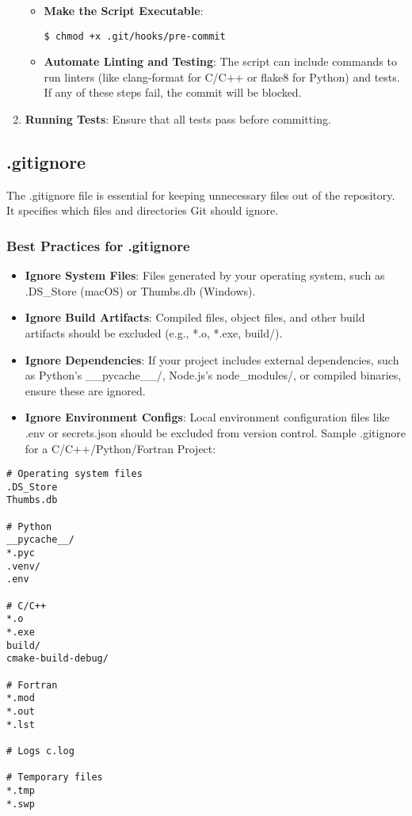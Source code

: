 \documentclass{ol-softwaremanual}
\begin{document}
\begin{enumerate}
\begin{itemize}
\item \textbf{Make the Script Executable}:
\begin{terminal}
\begin{verbatim}
$ chmod +x .git/hooks/pre-commit
\end{verbatim}
\end{terminal}

\item \textbf{Automate Linting and Testing}:
The script can include commands to run linters (like clang-format for C/C++ or flake8 for Python) and tests. If any of these steps fail, the commit will be blocked.
\end{itemize}
\item \textbf{Running Tests}: Ensure that all tests pass before committing.
\end{enumerate}
\subsection{.gitignore}
The .gitignore file is essential for keeping unnecessary files out of the repository. It specifies which files and directories Git should ignore.

\subsubsection{Best Practices for .gitignore}
\begin{itemize}
    \item \textbf{Ignore System Files}: Files generated by your operating system, such as .DS\_Store (macOS) or Thumbs.db (Windows).
    \item \textbf{Ignore Build Artifacts}: Compiled files, object files, and other build artifacts should be excluded (e.g., *.o, *.exe, build/).
    \item \textbf{Ignore Dependencies}: If your project includes external dependencies, such as Python’s \_\_pycache\_\_/, Node.js’s node\_modules/, or compiled binaries, ensure these are ignored.
    \item \textbf{Ignore Environment Configs}: Local environment configuration files like .env or secrets.json should be excluded from version control.
    Sample .gitignore for a C/C++/Python/Fortran Project:
\end{itemize}
\begin{example}
\begin{verbatim}
# Operating system files
.DS_Store
Thumbs.db

# Python
__pycache__/
*.pyc
.venv/
.env

# C/C++
*.o
*.exe
build/
cmake-build-debug/

# Fortran
*.mod
*.out
*.lst

# Logs c.log

# Temporary files
*.tmp
*.swp
\end{verbatim}
\end{example}
\end{document}
